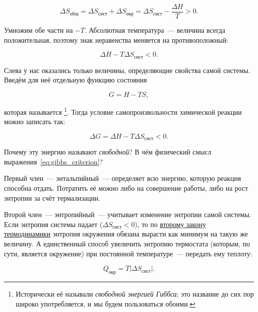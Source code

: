 \begin{equation*}
    \Delta S_{\text{общ}} = \Delta S_{\text{сист}} + \Delta S_{\text{окр}} = \Delta S_{\text{сист}} - \frac{\Delta H}{T} > 0.
\end{equation*}

Умножим обе части на $-T$. Абсолютная температура~--- величина всегда положительная, поэтому знак неравенства меняется на противоположный:

\begin{equation*}
    \Delta H - T \Delta S_{\text{сист}} < 0.
\end{equation*}

Слева у нас оказались только величины, определяющие свойства самой системы. Введём для неё отдельную функцию состояния

\begin{equation}
    \label{eq:gibbs_energy}
    \boxed{G = H - TS},
\end{equation}

которая называется \footnote{Исторически её называли \emph{свободной энергией Гиббса}; это название до сих пор широко употребляется, и мы будем пользоваться обоими.}. Тогда условие самопроизвольности химической реакции можно записать так:

\begin{equation}
    \label{eq:gibbs_criterion}
    \boxed{\Delta G = \Delta H - T \Delta S_{\text{сист}} < 0}.
\end{equation}

Почему эту энергию называют \emph{свободной}? В чём физический смысл выражения~\eqref{eq:gibbs_criterion}?

Первый член~--- энтальпийный~--- определяет всю энергию, которую реакция способна отдать. Потратить её можно либо на совершение работы, либо на рост энтропии за счёт термализации.

Второй член~--- энтропийный~--- учитывает изменение энтропии самой системы. Если энтропия системы падает ($\Delta S_{\text{сист}} < 0$), то по \hyperref[term:second_law_of_thermodynamics]{второму закону термодинамики} энтропия окружения обязана вырасти как минимум на такую же величину. А единственный способ увеличить энтропию термостата (которым, по сути, является окружение) при постоянной температуре~--- передать ему теплоту:

\begin{equation*}
    Q_{\text{окр}} = T \left| \Delta S_{\text{сист}} \right|.
\end{equation*}

